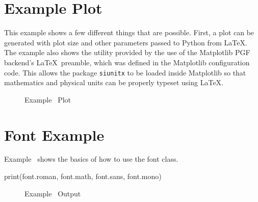 \documentclass[12pt, titlepage]{article}
\begin{document}
\section{Example Plot}

This example shows a few different things that are possible. First, a plot can be generated with plot size and other parameters passed to Python from \LaTeX. The example also shows the utility provided by the use of the Matplotlib PGF backend's \LaTeX\ preamble, which was defined in the Matplotlib configuration code. This allows the package \texttt{siunitx} to be loaded inside Matplotlib so that mathematics and physical units can be properly typeset using \LaTeX.


\begin{figure}[h!]

\caption{Example \thesection\ Plot}
\end{figure}

\section{Font Example}

Example \thesection\ shows the basics of how to use the font class.

\begin{pyblock}

print(font.roman, font.math, font.sans, font.mono)

\end{pyblock}

\begin{figure}[h!]
    \begin{center}
        \ttfamily\printpythontex
    \end{center}
\caption{Example \thesection\ Output}
\end{figure}
\end{document}
